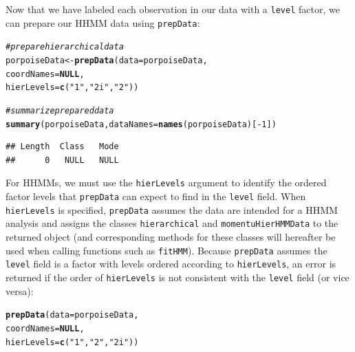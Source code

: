 \documentclass[12pt]{article}\usepackage[]{graphicx}\usepackage[]{color}
\makeatletter
\newcommand{\hlnum}[1]{\textcolor[rgb]{0.686,0.059,0.569}{#1}}%
\newcommand{\hlstr}[1]{\textcolor[rgb]{0.192,0.494,0.8}{#1}}%
\newcommand{\hlcom}[1]{\textcolor[rgb]{0.678,0.584,0.686}{\textit{#1}}}%
\newcommand{\hlopt}[1]{\textcolor[rgb]{0,0,0}{#1}}%
\newcommand{\hlstd}[1]{\textcolor[rgb]{0.345,0.345,0.345}{#1}}%
\newcommand{\hlkwa}[1]{\textcolor[rgb]{0.161,0.373,0.58}{\textbf{#1}}}%
\newcommand{\hlkwb}[1]{\textcolor[rgb]{0.69,0.353,0.396}{#1}}%
\newcommand{\hlkwc}[1]{\textcolor[rgb]{0.333,0.667,0.333}{#1}}%
\newcommand{\hlkwd}[1]{\textcolor[rgb]{0.737,0.353,0.396}{\textbf{#1}}}%
\newenvironment{kframe}{%
 \def\at@end@of@kframe{}%
 \ifinner\ifhmode%
  \def\at@end@of@kframe{\end{minipage}}%
  \begin{minipage}{\columnwidth}%
 \fi\fi%
 \def\FrameCommand##1{\hskip\@totalleftmargin \hskip-\fboxsep
 \colorbox{shadecolor}{##1}\hskip-\fboxsep
     \hskip-\linewidth \hskip-\@totalleftmargin \hskip\columnwidth}%
 \MakeFramed {\advance\hsize-\width
   \@totalleftmargin\z@ \linewidth\hsize
   \@setminipage}}%
 {\par\unskip\endMakeFramed%
 \at@end@of@kframe}
\newenvironment{knitrout}{}{} %
\makeatother
\begin{document}
Now that we have labeled each observation in our data with a \verb|level| factor, we can prepare our HHMM data using \verb|prepData|:
\begin{knitrout}
\color{fgcolor}\begin{kframe}
\begin{alltt}
\hlcom{# prepare hierarchical data}
\hlstd{porpoiseData} \hlkwb{<-} \hlkwd{prepData}\hlstd{(}\hlkwc{data} \hlstd{= porpoiseData,}
                         \hlkwc{coordNames} \hlstd{=} \hlkwa{NULL}\hlstd{,}
                         \hlkwc{hierLevels} \hlstd{=} \hlkwd{c}\hlstd{(}\hlstr{"1"}\hlstd{,} \hlstr{"2i"}\hlstd{,} \hlstr{"2"}\hlstd{))}
\end{alltt}


{\ttfamily\noindent\bfseries{}}\begin{alltt}
\hlcom{# summarize prepared data}
\hlkwd{summary}\hlstd{(porpoiseData,} \hlkwc{dataNames} \hlstd{=} \hlkwd{names}\hlstd{(porpoiseData)[}\hlopt{-}\hlnum{1}\hlstd{])}
\end{alltt}
\begin{verbatim}
## Length  Class   Mode 
##      0   NULL   NULL
\end{verbatim}
\end{kframe}
\end{knitrout}
\noindent For HHMMs, we must use the \verb|hierLevels| argument to identify the ordered factor levels that \verb|prepData| can expect to find in the \verb|level| field. When \verb|hierLevels| is specified, \verb|prepData| assumes the data are intended for a HHMM analysis and assigns the classes \verb|hierarchical| and \verb|momentuHierHMMData| to the returned object (and corresponding methods for these classes will hereafter be used when calling functions such as \verb|fitHMM|). Because \verb|prepData| assumes the \verb|level| field is a factor with levels ordered according to \verb|hierLevels|, an error is returned if the order of \verb|hierLevels| is not consistent with the \verb|level| field (or vice versa): 
\begin{knitrout}
\color{fgcolor}\begin{kframe}
\begin{alltt}
\hlkwd{prepData}\hlstd{(}\hlkwc{data} \hlstd{= porpoiseData,}
                \hlkwc{coordNames} \hlstd{=} \hlkwa{NULL}\hlstd{,}
                \hlkwc{hierLevels} \hlstd{=} \hlkwd{c}\hlstd{(}\hlstr{"1"}\hlstd{,} \hlstr{"2"}\hlstd{,} \hlstr{"2i"}\hlstd{))}
\end{alltt}


{\ttfamily\noindent\bfseries{}}\end{kframe}
\end{knitrout}
\end{document}

